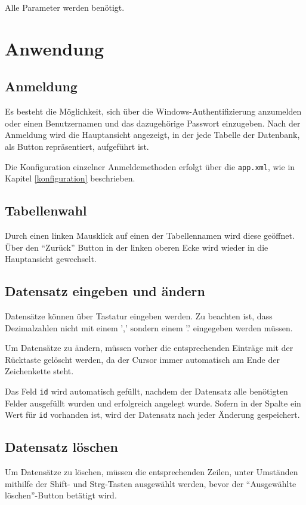 			Alle Parameter werden benötigt.

\chapter{Anwendung}
	\section{Anmeldung}
		Es besteht die Möglichkeit, sich über die Windows-Authentifizierung anzumelden
		oder einen Benutzernamen und das dazugehörige Passwort einzugeben.
		Nach der Anmeldung wird die Hauptansicht angezeigt, in der jede Tabelle der
		Datenbank, als Button repräsentiert, aufgeführt ist.
		
		Die Konfiguration einzelner Anmeldemethoden erfolgt über die \texttt{app.xml},
		wie in Kapitel \ref{konfiguration} beschrieben.
		
	\section{Tabellenwahl}
		Durch einen linken Mausklick auf einen der Tabellennamen wird diese geöffnet.
		Über den ``Zurück'' Button in der linken oberen Ecke wird wieder in die
		Hauptansicht gewechselt.
		
	\section{Datensatz eingeben und ändern}
		Datensätze können über Tastatur eingeben werden. Zu beachten ist, dass
		Dezimalzahlen nicht mit einem ',' sondern einem '.' eingegeben werden müssen.
		
		Um Datensätze zu ändern, müssen vorher die entsprechenden Einträge mit der
		Rücktaste gelöscht werden, da der Cursor immer automatisch am Ende der
		Zeichenkette steht.
		
		Das Feld \texttt{id} wird automatisch gefüllt, nachdem der Datensatz
		alle benötigten Felder ausgefüllt wurden und erfolgreich angelegt wurde.
		Sofern in der Spalte ein Wert für \texttt{id} vorhanden ist, wird der
		Datensatz nach jeder Änderung gespeichert.
		
	\section{Datensatz löschen}
		Um Datensätze zu löschen, müssen die entsprechenden Zeilen, unter Umständen
		mithilfe der Shift- und Strg-Tasten ausgewählt werden, bevor der "`Ausgewählte
		löschen"'-Button betätigt wird.
		
